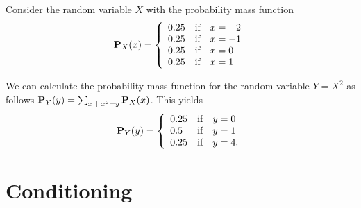\begin{flex}
\begin{example}
\end{example}

\begin{example}
Consider the random variable $X$ with the probability mass function 
\[
\mathbf{P}_{X}(x) = 
\left\{
\begin{array}{lll}
0.25  & \mbox{if} & x = -2
\\
0.25  & \mbox{if} & x = -1
\\
0.25  & \mbox{if} & x = 0
\\
0.25  & \mbox{if} & x = 1
\end{array}
\right.
\]

We can calculate the probability mass function for the random variable
$Y = X^2$ as follows $\mathbf{P}_{Y}(y) = \sum_{x ~\mid~ x^2 =
  y}\mathbf{P}_{X}(x)$.
%
This yields
\[
\mathbf{P}_{Y}(y) = 
\left\{
\begin{array}{lll}
0.25  & \mbox{if} & y = 0
\\
0.5  & \mbox{if} & y = 1
\\
0.25  & \mbox{if} & y = 4.
\end{array}
\right.
\]

\end{example}
\end{flex}

\section{Conditioning}
\label{sec:probability::randvar::conditioning}

